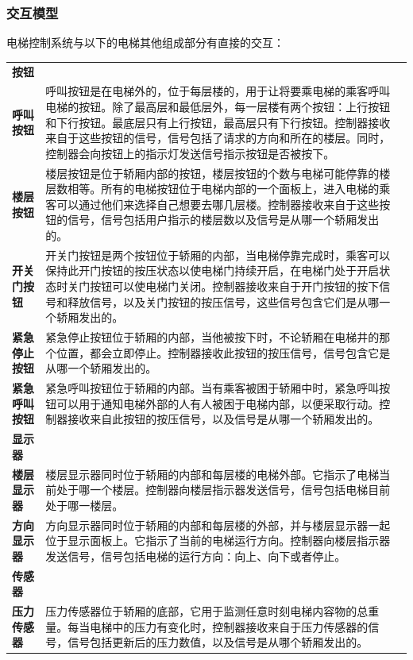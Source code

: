 \subsubsection{交互模型}
电梯控制系统与以下的电梯其他组成部分有直接的交互：
\begin{longtable}{>{\flushright\textbf\bgroup}m{}<{\egroup} p{}}
	\Large{按钮} & \\
	呼叫按钮 & 呼叫按钮是在电梯外的，位于每层楼的，用于让将要乘电梯的乘客呼叫电梯的按钮。除了最高层和最低层外，每一层楼有两个按钮：上行按钮和下行按钮。最底层只有上行按钮，最高层只有下行按钮。控制器接收来自于这些按钮的信号，信号包括了请求的方向和所在的楼层。同时，控制器会向按钮上的指示灯发送信号指示按钮是否被按下。\\
	楼层按钮 & 楼层按钮是位于轿厢内部的按钮，楼层按钮的个数与电梯可能停靠的楼层数相等。所有的电梯按钮位于电梯内部的一个面板上，进入电梯的乘客可以通过他们来选择自己想要去哪几层楼。控制器接收来自于这些按钮的信号，信号包括用户指示的楼层数以及信号是从哪一个轿厢发出的。\\
	开关门按钮 & 开关门按钮是两个按钮位于轿厢的内部，当电梯停靠完成时，乘客可以保持此开门按钮的按压状态以使电梯门持续开启，在电梯门处于开启状态时关门按钮可以使电梯门关闭。控制器接收来自于开门按钮的按下信号和释放信号，以及关门按钮的按压信号，这些信号包含它们是从哪一个轿厢发出的。\\
	紧急停止按钮 & 紧急停止按钮位于轿厢的内部，当他被按下时，不论轿厢在电梯井的那个位置，都会立即停止。控制器接收此按钮的按压信号，信号包含它是从哪一个轿厢发出的。\\
	紧急呼叫按钮 & 紧急呼叫按钮位于轿厢的内部。当有乘客被困于轿厢中时，紧急呼叫按钮可以用于通知电梯外部的人有人被困于电梯内部，以便采取行动。控制器接收来自此按钮的按压信号，以及信号是从哪一个轿厢发出的。\\
	\Large{显示器} & \\
	楼层显示器 & 楼层显示器同时位于轿厢的内部和每层楼的电梯外部。它指示了电梯当前处于哪一个楼层。控制器向楼层指示器发送信号，信号包括电梯目前处于哪一楼层。\\
	方向显示器 & 方向显示器同时位于轿厢的内部和每层楼的外部，并与楼层显示器一起位于显示面板上。它指示了当前的电梯运行方向。控制器向楼层指示器发送信号，信号包括电梯的运行方向：向上、向下或者停止。\\
	\Large{传感器} & \\
	压力传感器 & 压力传感器位于轿厢的底部，它用于监测任意时刻电梯内容物的总重量。每当电梯中的压力有变化时，控制器接收来自于压力传感器的信号，信号包括更新后的压力数值，以及信号是从哪个轿厢发出的。\\

\end{longtable}
